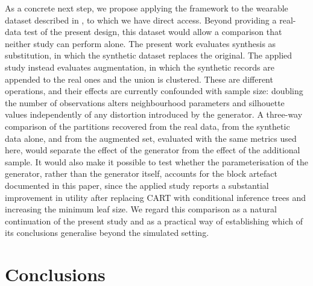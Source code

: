 \documentclass[pdflatex,sn-basic]{sn-jnl}
\begin{document}
As a concrete next step, we propose applying the framework to the wearable
dataset described in \citet{vidiella2025}, to which we have direct access.
Beyond providing a real-data test of the present design, this dataset would
allow a comparison that neither study can perform alone. The present work
evaluates synthesis as substitution, in which the synthetic dataset replaces
the original. The applied study instead evaluates augmentation, in which the
synthetic records are appended to the real ones and the union is clustered.
These are different operations, and their effects are currently confounded
with sample size: doubling the number of observations alters neighbourhood
parameters and silhouette values independently of any distortion introduced by
the generator. A three-way comparison of the partitions recovered from the real
data, from the synthetic data alone, and from the augmented set, evaluated with
the same metrics used here, would separate the effect of the generator from
the effect of the additional sample. It would also make it possible to test
whether the parameterisation of the generator, rather than the generator
itself, accounts for the block artefact documented in this paper, since the
applied study reports a substantial improvement in utility after replacing
CART with conditional inference trees \citep{hothorn2006} and increasing the
minimum leaf size. We regard this comparison as a natural continuation of the
present study and as a practical way of establishing which of its conclusions
generalise beyond the simulated setting.

\section{Conclusions}
\end{document}
